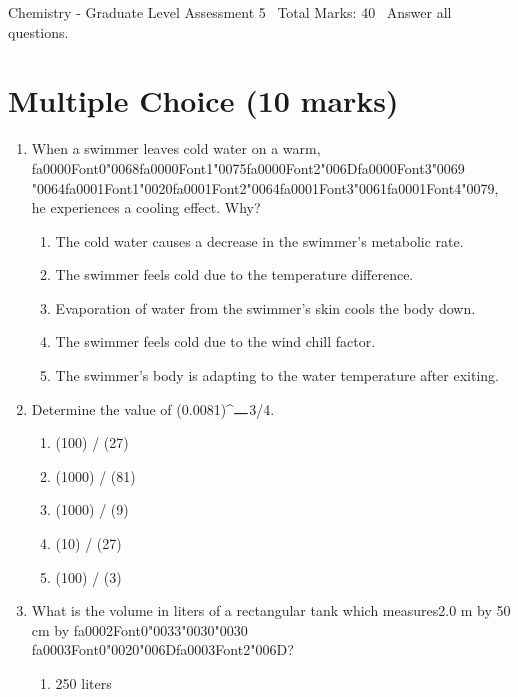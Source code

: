 \documentclass[12pt]{article}
\begin{document}
\begin{center}
Chemistry - Graduate Level Assessment 5 \
Total Marks: 40 \
Answer all questions.
\end{center}

\section*{Multiple Choice (10 marks)}
\begin{enumerate}[label=\arabic*.]
\item When a swimmer leaves cold water on a warm, {\csname fa0000Font0\endcsname\char"0068}{\csname fa0000Font1\endcsname\char"0075}{\csname fa0000Font2\endcsname\char"006D}{\csname fa0000Font3\endcsname\char"0069} {\char"0064}{\csname fa0001Font1\endcsname\char"0020}{\csname fa0001Font2\endcsname\char"0064}{\csname fa0001Font3\endcsname\char"0061}{\csname fa0001Font4\endcsname\char"0079}, he experiences a cooling effect.
Why?
\begin{enumerate}[label=(\alph*)]
    \item The cold water causes a decrease in the swimmer's metabolic rate.
    \item The swimmer feels cold due to the temperature difference.
    \item Evaporation of water from the swimmer's skin cools the body down.
    \item The swimmer feels cold due to the wind chill factor.
    \item The swimmer's body is adapting to the water temperature after exiting.
\end{enumerate}
\item Determine the value of (0.0081)\^{}\ensuremath{\rule{1em}{1pt}}3/4.
\begin{enumerate}[label=(\alph*)]
    \item (100) / (27)
    \item (1000) / (81)
    \item (1000) / (9)
    \item (10) / (27)
    \item (100) / (3)
\end{enumerate}
\item What is the volume in liters of a rectangular tank which measures2.0 m by 50 cm by {\csname fa0002Font0\endcsname\char"0033}{\char"0030}{\char"0030} {\csname fa0003Font0\endcsname\char"0020}{\char"006D}{\csname fa0003Font2\endcsname\char"006D}?
\begin{enumerate}[label=(\alph*)]
    \item 250 liters

\end{enumerate}
\end{enumerate}
\end{document}
